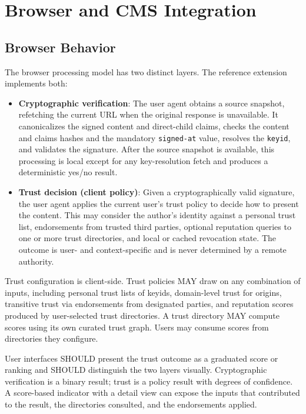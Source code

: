 \documentclass{article}
\begin{document}
\section{Browser and CMS Integration}

\subsection{Browser Behavior}
The browser processing model has two distinct layers. The reference extension implements both:

\begin{itemize}
  \item \textbf{Cryptographic verification}: The user agent obtains a source snapshot, refetching the current URL when the original response is unavailable. It canonicalizes the signed content and direct-child claims, checks the content and claims hashes and the mandatory \texttt{signed-at} value, resolves the \texttt{keyid}, and validates the signature. After the source snapshot is available, this processing is local except for any key-resolution fetch and produces a deterministic yes/no result.
  \item \textbf{Trust decision (client policy)}: Given a cryptographically valid signature, the user agent applies the current user's trust policy to decide how to present the content. This may consider the author's identity against a personal trust list, endorsements from trusted third parties, optional reputation queries to one or more trust directories, and local or cached revocation state. The outcome is user- and context-specific and is never determined by a remote authority.
\end{itemize}

Trust configuration is client-side. Trust policies MAY draw on any combination of inputs, including personal trust lists of keyids, domain-level trust for origins, transitive trust via endorsements from designated parties, and reputation scores produced by user-selected trust directories. A trust directory MAY compute scores using its own curated trust graph. Users may consume scores from directories they configure.

User interfaces SHOULD present the trust outcome as a graduated score or ranking and SHOULD distinguish the two layers visually. Cryptographic verification is a binary result; trust is a policy result with degrees of confidence. A score-based indicator with a detail view can expose the inputs that contributed to the result, the directories consulted, and the endorsements applied.
\end{document}
